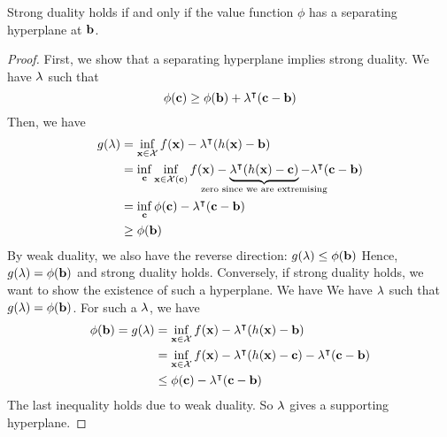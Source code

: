 \begin{theorem}
	Strong duality holds if and only if the value function \( \phi \) has a separating hyperplane at \( \vb b \).
\end{theorem}
\begin{proof}
	First, we show that a separating hyperplane implies strong duality.
	We have \( \vb \lambda \) such that
	\[
		\phi(\vb c) \geq \phi(\vb b) + \vb\lambda^\intercal (\vb c - \vb b)
	\]
	Then, we have
	\begin{align*}
		g(\vb \lambda) & = \inf_{\vb x \in \mathcal X} f(\vb x) - \vb\lambda^\transpose (h(\vb x) - \vb b)                                                                                                                           \\
		               & = \inf_{\vb c} \inf_{\vb x \in \mathcal X(\vb c)} f(\vb x) - \underbrace{\vb\lambda^\transpose (h(\vb x) - \vb c)}_{\mathclap{\text{zero since we are extremising}}} - \vb\lambda^\transpose(\vb c - \vb b) \\
		               & = \inf_{\vb c} \phi(\vb c) - \vb\lambda^\transpose(\vb c - \vb b)                                                                                                                                           \\
		               & \geq \phi(\vb b)
	\end{align*}
	By weak duality, we also have the reverse direction: \( g(\vb \lambda) \leq \phi(\vb b) \)
	Hence, \( g(\vb \lambda) = \phi(\vb b) \) and strong duality holds.
	Conversely, if strong duality holds, we want to show the existence of such a hyperplane.
	We have We have \( \vb \lambda \) such that \( g(\vb \lambda) = \phi(\vb b) \).
	For such a \( \vb \lambda \), we have
	\begin{align*}
		\phi(\vb b) = g(\vb \lambda) & = \inf_{\vb x \in \mathcal X} f(\vb x) - \vb\lambda^\intercal (h(\vb x) - \vb b)                                        \\
		                             & = \inf_{\vb x \in \mathcal X} f(\vb x) - \vb\lambda^\intercal (h(\vb x) - \vb c) - \vb\lambda^\intercal(\vb c - \vb b) \\
		                             & \leq \phi(\vb c) - \vb\lambda^\intercal(\vb c - \vb b)
	\end{align*}
	The last inequality holds due to weak duality.
	So \( \vb \lambda \) gives a supporting hyperplane.
\end{proof}

